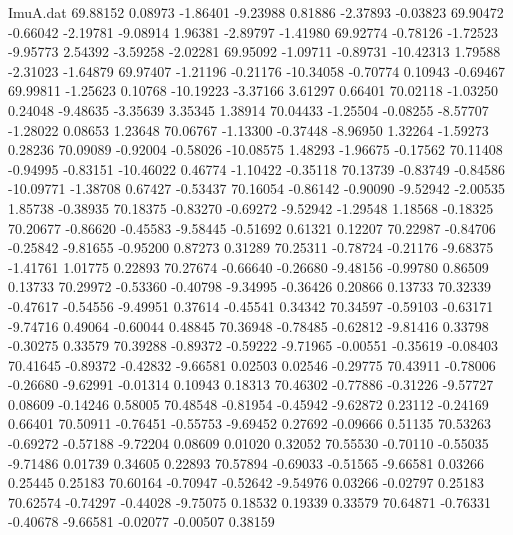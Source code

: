 \begin{filecontents}{ImuA.dat}
  69.88152    0.08973   -1.86401   -9.23988    0.81886   -2.37893   -0.03823
  69.90472   -0.66042   -2.19781   -9.08914    1.96381   -2.89797   -1.41980
  69.92774   -0.78126   -1.72523   -9.95773    2.54392   -3.59258   -2.02281
  69.95092   -1.09711   -0.89731  -10.42313    1.79588   -2.31023   -1.64879
  69.97407   -1.21196   -0.21176  -10.34058   -0.70774    0.10943   -0.69467
  69.99811   -1.25623    0.10768  -10.19223   -3.37166    3.61297    0.66401
  70.02118   -1.03250    0.24048   -9.48635   -3.35639    3.35345    1.38914
  70.04433   -1.25504   -0.08255   -8.57707   -1.28022    0.08653    1.23648
  70.06767   -1.13300   -0.37448   -8.96950    1.32264   -1.59273    0.28236
  70.09089   -0.92004   -0.58026  -10.08575    1.48293   -1.96675   -0.17562
  70.11408   -0.94995   -0.83151  -10.46022    0.46774   -1.10422   -0.35118
  70.13739   -0.83749   -0.84586  -10.09771   -1.38708    0.67427   -0.53437
  70.16054   -0.86142   -0.90090   -9.52942   -2.00535    1.85738   -0.38935
  70.18375   -0.83270   -0.69272   -9.52942   -1.29548    1.18568   -0.18325
  70.20677   -0.86620   -0.45583   -9.58445   -0.51692    0.61321    0.12207
  70.22987   -0.84706   -0.25842   -9.81655   -0.95200    0.87273    0.31289
  70.25311   -0.78724   -0.21176   -9.68375   -1.41761    1.01775    0.22893
  70.27674   -0.66640   -0.26680   -9.48156   -0.99780    0.86509    0.13733
  70.29972   -0.53360   -0.40798   -9.34995   -0.36426    0.20866    0.13733
  70.32339   -0.47617   -0.54556   -9.49951    0.37614   -0.45541    0.34342
  70.34597   -0.59103   -0.63171   -9.74716    0.49064   -0.60044    0.48845
  70.36948   -0.78485   -0.62812   -9.81416    0.33798   -0.30275    0.33579
  70.39288   -0.89372   -0.59222   -9.71965   -0.00551   -0.35619   -0.08403
  70.41645   -0.89372   -0.42832   -9.66581    0.02503    0.02546   -0.29775
  70.43911   -0.78006   -0.26680   -9.62991   -0.01314    0.10943    0.18313
  70.46302   -0.77886   -0.31226   -9.57727    0.08609   -0.14246    0.58005
  70.48548   -0.81954   -0.45942   -9.62872    0.23112   -0.24169    0.66401
  70.50911   -0.76451   -0.55753   -9.69452    0.27692   -0.09666    0.51135
  70.53263   -0.69272   -0.57188   -9.72204    0.08609    0.01020    0.32052
  70.55530   -0.70110   -0.55035   -9.71486    0.01739    0.34605    0.22893
  70.57894   -0.69033   -0.51565   -9.66581    0.03266    0.25445    0.25183
  70.60164   -0.70947   -0.52642   -9.54976    0.03266   -0.02797    0.25183
  70.62574   -0.74297   -0.44028   -9.75075    0.18532    0.19339    0.33579
  70.64871   -0.76331   -0.40678   -9.66581   -0.02077   -0.00507    0.38159

\end{filecontents}
